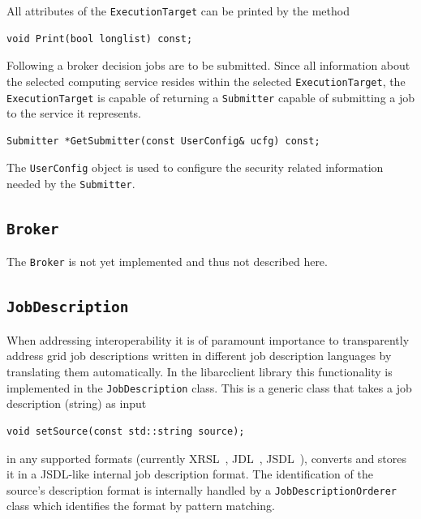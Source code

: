 \documentclass{book}
\newcommand{\arclib}{libarcclient}
\newcommand{\Broker}{\texttt{Broker}}
\newcommand{\ExecutionTarget}{\texttt{ExecutionTarget}}
\newcommand{\JobDescription}{\texttt{JobDescription}}
\newcommand{\Submitter}{\texttt{Submitter}}
\newcommand{\UserConfig}{\texttt{UserConfig}}
\begin{document}
All attributes of the {\ExecutionTarget} can be printed by the method

\begin{shaded}
\begin{verbatim}
void Print(bool longlist) const;
\end{verbatim}
\end{shaded}

Following a broker decision jobs are to be submitted. Since all
information about the selected computing service resides within the
selected {\ExecutionTarget}, the {\ExecutionTarget} is capable of
returning a {\Submitter} capable of submitting a job to the service it
represents.

\begin{shaded}
\begin{verbatim}
Submitter *GetSubmitter(const UserConfig& ucfg) const;
\end{verbatim}
\end{shaded}

The {\UserConfig} object is used to configure the security related
information needed by the {\Submitter}.

\subsection{{\Broker}}

The {\Broker} is not yet implemented and thus not described here.

\subsection{{\JobDescription}}

When addressing interoperability it is of paramount importance to
transparently address grid job descriptions written in different job
description languages by translating them automatically. In the
{\arclib} library this functionality is implemented in the
{\JobDescription} class. This is a generic class that takes a job
description (string) as input

\begin{shaded}
\begin{verbatim}
void setSource(const std::string source);
\end{verbatim}
\end{shaded}

in any supported formats (currently XRSL~\cite{xrsl}, JDL~\cite{jdl},
JSDL~\cite{jsdl}), converts and stores it in a JSDL-like internal job
description format. The identification of the source's description
format is internally handled by a \texttt{JobDescriptionOrderer} class
which identifies the format by pattern matching.
\end{document}
